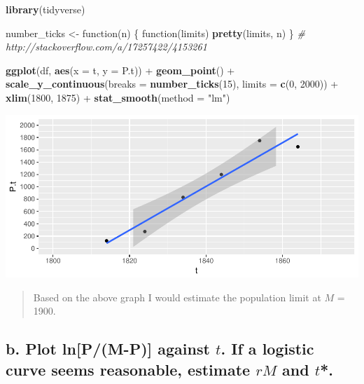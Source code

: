 \documentclass[]{article}
\newenvironment{Shaded}{\begin{snugshade}}{\end{snugshade}}
\newcommand{\KeywordTok}[1]{\textcolor[rgb]{0.13,0.29,0.53}{\textbf{{#1}}}}
\newcommand{\DataTypeTok}[1]{\textcolor[rgb]{0.13,0.29,0.53}{{#1}}}
\newcommand{\DecValTok}[1]{\textcolor[rgb]{0.00,0.00,0.81}{{#1}}}
\newcommand{\StringTok}[1]{\textcolor[rgb]{0.31,0.60,0.02}{{#1}}}
\newcommand{\CommentTok}[1]{\textcolor[rgb]{0.56,0.35,0.01}{\textit{{#1}}}}
\newcommand{\NormalTok}[1]{{#1}}
\begin{document}
\begin{Shaded}
\begin{Highlighting}[]
\KeywordTok{library}\NormalTok{(tidyverse)}

\NormalTok{number_ticks <-}\StringTok{ }\NormalTok{function(n) \{}
  \NormalTok{function(limits) }\KeywordTok{pretty}\NormalTok{(limits, n)}
  \NormalTok{\} }\CommentTok{# http://stackoverflow.com/a/17257422/4153261}

\KeywordTok{ggplot}\NormalTok{(df, }\KeywordTok{aes}\NormalTok{(}\DataTypeTok{x =} \NormalTok{t, }\DataTypeTok{y =} \NormalTok{P.t)) +}
\StringTok{  }\KeywordTok{geom_point}\NormalTok{() +}
\StringTok{  }\KeywordTok{scale_y_continuous}\NormalTok{(}\DataTypeTok{breaks =} \KeywordTok{number_ticks}\NormalTok{(}\DecValTok{15}\NormalTok{), }\DataTypeTok{limits =} \KeywordTok{c}\NormalTok{(}\DecValTok{0}\NormalTok{, }\DecValTok{2000}\NormalTok{)) +}\StringTok{ }
\StringTok{  }\KeywordTok{xlim}\NormalTok{(}\DecValTok{1800}\NormalTok{, }\DecValTok{1875}\NormalTok{) +}
\StringTok{  }\KeywordTok{stat_smooth}\NormalTok{(}\DataTypeTok{method =} \StringTok{"lm"}\NormalTok{)}
\end{Highlighting}
\end{Shaded}

\includegraphics{Christophe_Hunt_hw10_files/figure-latex/unnamed-chunk-3-1.pdf}

\begin{quote}
Based on the above graph I would estimate the population limit at \(M\)
= 1900.
\end{quote}

\subsection{\texorpdfstring{b. Plot ln{[}P/(M-P){]} against \(t\). If a
logistic curve seems reasonable, estimate \(rM\) and
\(t\)*.}{b. Plot ln{[}P/(M-P){]} against t. If a logistic curve seems reasonable, estimate rM and t*.}}\label{b.-plot-lnpm-p-against-t.-if-a-logistic-curve-seems-reasonable-estimate-rm-and-t.}
\end{document}
